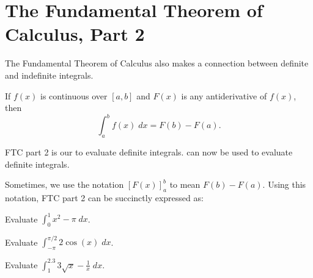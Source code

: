 \documentclass[../main.tex]{subfiles}
\begin{document}
 \section{The Fundamental Theorem of Calculus, Part 2}
  The Fundamental Theorem of Calculus also makes a connection between definite and indefinite integrals.

  \begin{mdframed}[style=withref-compact]
    If \(f(x)\) is continuous over \([a,b]\) and \(F(x)\) is any antiderivative of \(f(x)\), then 
    \[
      \int_{a}^{b} f(x) \;dx = F(b) - F(a).
    \]

  \end{mdframed}

  FTC part 2 is our  to evaluate definite integrals.  can now be used to evaluate definite integrals.

  Sometimes, we use the notation \([F(x)]_{a}^{b}\) to mean \(F(b) - F(a)\). Using this notation, FTC part 2 can be succinctly expressed as:

  \begin{example}
    Evaluate \(\int_{0}^{1} x^{2} - \pi \;dx\).
  \end{example}
  \clearpage

  \begin{example}
    Evaluate \(\int_{-\pi}^{\pi/2} 2\cos(x) \;dx\).
  \end{example}

  \begin{example}
    Evaluate \(\int_{1}^{2.3} 3 \sqrt{x} - \frac{1}{x} \;dx\).
  \end{example}
\end{document}
